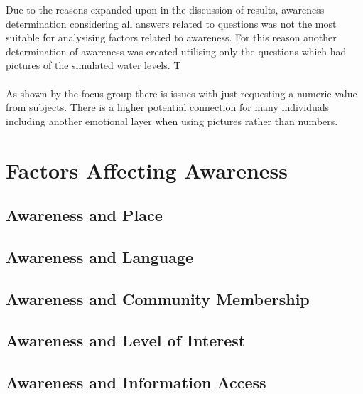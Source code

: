 Due to the reasons expanded upon in the discussion of results, awareness determination considering all answers related to questions was not the most suitable for analysising factors related to awareness. For this reason another determination of awareness was created utilising only the questions which had pictures of the simulated water levels. T

\paragraph{}
As shown by the focus group there is issues with just requesting a numeric value from subjects. There is a higher potential connection for many individuals including another emotional layer when using pictures rather than numbers. 

\section{Factors Affecting Awareness}

\subsection{ Awareness and Place}

\subsection{Awareness and Language}

\subsection{Awareness and Community Membership}

\subsection{Awareness and Level of Interest}

\subsection{Awareness and Information Access}